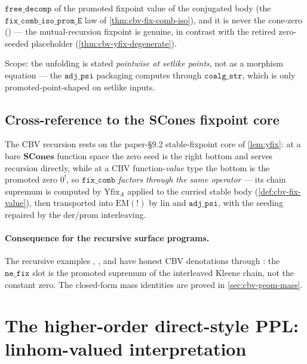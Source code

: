 \begin{theorem}
\begin{itemize}
    $\mathtt{free\_decomp}$ of the promoted fixpoint value of the
    conjugated body (the
    $\mathtt{fix\_comb\_iso\_prom\_E}$ law of
    \autoref{thm:cbv-fix-comb-iso}), and it is never the cone-zero
    ()
    --- the mutual-recursion fixpoint is genuine, in contrast with the
    retired zero-seeded placeholder
    (\autoref{thm:cbv-yfix-degenerate}).
\end{itemize}
Scope: the unfolding is stated \emph{pointwise at setlike
points}, not as a morphism equation --- the $\mathtt{adj\_psi}$
packaging computes through $\mathtt{coalg\_str}$, which is only
promoted-point-shaped on setlike inputs.
\end{theorem}

\subsection{Cross-reference to the SCones fixpoint core}%
\label{ssec:cbv-yfix-core}

The CBV recursion rests on the paper-\S9.2 stable-fixpoint core of
\autoref{lem:yfix}: at a bare $\mathbf{SCones}$ function space the
zero seed is the right bottom and 
serves recursion directly, while at a CBV function-\emph{value} type
the bottom is the promoted zero $0^!$, so $\mathtt{fix\_comb}$
\emph{factors through the same operator} --- its chain supremum is
computed by $\mathrm{Yfix}_A$ applied to the curried stable body
(\autoref{def:cbv-fix-value}), then transported into
$\mathrm{EM}(\mathord{!})$ by $\mathrm{lin}$ and $\mathtt{adj\_psi}$,
with the seeding repaired by the $\mathrm{der}$/$\mathrm{prom}$
interleaving.

\paragraph{Consequence for the recursive surface programs.}
The recursive examples ,
,
 and
 have honest CBV denotations
through : the $\mathtt{ne\_fix}$ slot
is the promoted supremum of the interleaved Kleene chain, not the
constant zero. The closed-form mass identities are proved in
\autoref{sec:cbv-geom-mass}.

\section{The higher-order direct-style PPL: linhom-valued interpretation}%
\label{sec:cbv-ppl}

